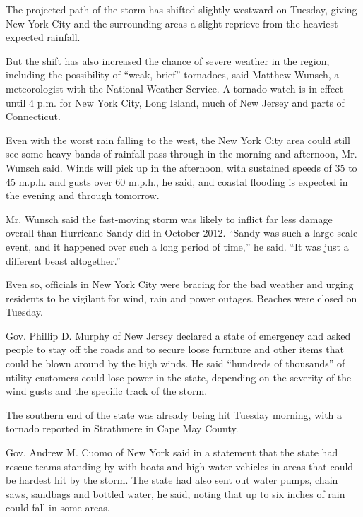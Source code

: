 The projected path of the storm has shifted slightly westward on
Tuesday, giving New York City and the surrounding areas a slight
reprieve from the heaviest expected rainfall.

But the shift has also increased the chance of severe weather in the
region, including the possibility of ``weak, brief'' tornadoes, said
Matthew Wunsch, a meteorologist with the National Weather Service. A
tornado watch is in effect until 4 p.m. for New York City, Long Island,
much of New Jersey and parts of Connecticut.

Even with the worst rain falling to the west, the New York City area
could still see some heavy bands of rainfall pass through in the morning
and afternoon, Mr. Wunsch said. Winds will pick up in the afternoon,
with sustained speeds of 35 to 45 m.p.h. and gusts over 60 m.p.h., he
said, and coastal flooding is expected in the evening and through
tomorrow.

Mr. Wunsch said the fast-moving storm was likely to inflict far less
damage overall than Hurricane Sandy did in October 2012. ``Sandy was
such a large-scale event, and it happened over such a long period of
time,'' he said. ``It was just a different beast altogether.''

Even so, officials in New York City were bracing for the bad weather and
urging residents to be vigilant for wind, rain and power outages.
Beaches were closed on Tuesday.

Gov. Phillip D. Murphy of New Jersey declared a state of emergency and
asked people to stay off the roads and to secure loose furniture and
other items that could be blown around by the high winds. He said
``hundreds of thousands'' of utility customers could lose power in the
state, depending on the severity of the wind gusts and the specific
track of the storm.

The southern end of the state was already being hit Tuesday morning,
with a tornado reported in Strathmere in Cape May County.

Gov. Andrew M. Cuomo of New York said in a statement that the state had
rescue teams standing by with boats and high-water vehicles in areas
that could be hardest hit by the storm. The state had also sent out
water pumps, chain saws, sandbags and bottled water, he said, noting
that up to six inches of rain could fall in some areas.

\hypertarget{-4}{%
\subsection{}\label{-4}}

